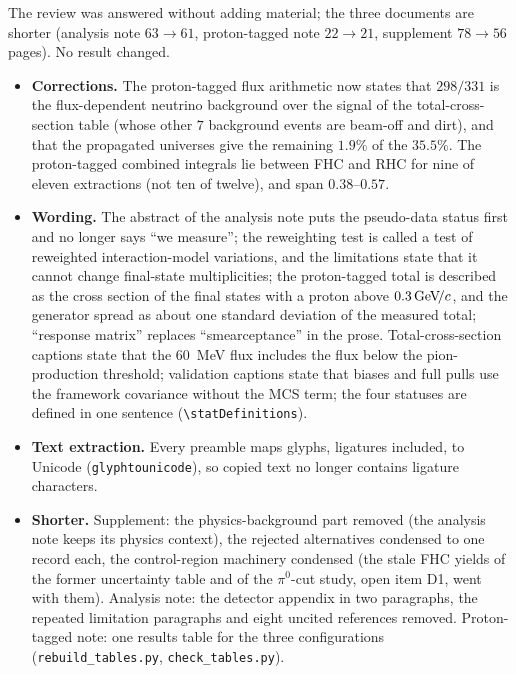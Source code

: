 The review was answered without adding material; the three documents are shorter (analysis note $63\to61$,
proton-tagged note $22\to21$, supplement $78\to56$ pages). No result changed.
\begin{itemize}\itemsep1pt
  \item \textbf{Corrections.} The proton-tagged flux arithmetic now states that $298/331$ is the
    flux-dependent neutrino background over the signal of the total-cross-section table (whose other $7$
    background events are beam-off and dirt), and that the propagated universes give the remaining
    $1.9\%$ of the $35.5\%$. The proton-tagged combined integrals lie between FHC and RHC for nine of eleven
    extractions (not ten of twelve), and span $0.38$--$0.57$.
  \item \textbf{Wording.} The abstract of the analysis note puts the pseudo-data status first and no
    longer says ``we measure''; the reweighting test is called a test of reweighted interaction-model
    variations, and the limitations state that it cannot change final-state multiplicities; the
    proton-tagged total is described as the cross section of the final states with a proton above
    $0.3\,\text{GeV}\!/c$, and the generator spread as about one standard deviation of the measured total; ``response
    matrix'' replaces ``smearceptance'' in the prose. Total-cross-section captions state that the $60$~MeV
    flux includes the flux below the pion-production threshold; validation captions state that biases
    and full pulls use the framework covariance without the MCS term; the four statuses are defined in
    one sentence (\texttt{\textbackslash statDefinitions}).
  \item \textbf{Text extraction.} Every preamble maps glyphs, ligatures included, to Unicode
    (\texttt{glyphtounicode}), so copied text no longer contains ligature characters.
  \item \textbf{Shorter.} Supplement: the physics-background part removed (the analysis note keeps its
    physics context), the rejected alternatives condensed to one record each, the control-region machinery
    condensed (the stale FHC yields of the former uncertainty table and of the $\pi^0$-cut study, open item
    D1, went with them). Analysis note: the detector appendix in two paragraphs, the repeated limitation
    paragraphs and eight uncited references removed. Proton-tagged note: one results table for the three
    configurations (\texttt{rebuild\_tables.py}, \texttt{check\_tables.py}).
\end{itemize}

